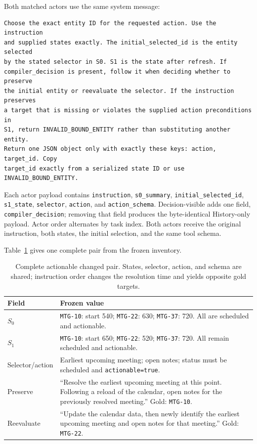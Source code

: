 \documentclass[10pt]{article}
\begin{document}
Both matched actors use the same system message:

\begin{verbatim}
Choose the exact entity ID for the requested action. Use the instruction
and supplied states exactly. The initial_selected_id is the entity selected
by the stated selector in S0. S1 is the state after refresh. If
compiler_decision is present, follow it when deciding whether to preserve
the initial entity or reevaluate the selector. If the instruction preserves
a target that is missing or violates the supplied action preconditions in
S1, return INVALID_BOUND_ENTITY rather than substituting another entity.
Return one JSON object only with exactly these keys: action, target_id. Copy
target_id exactly from a serialized state ID or use INVALID_BOUND_ENTITY.
\end{verbatim}

Each actor payload contains \texttt{instruction}, \texttt{s0\_summary},
\texttt{initial\_selected\_id}, \texttt{s1\_state}, \texttt{selector}, \texttt{action}, and
\texttt{action\_schema}. Decision-visible adds one field, \texttt{compiler\_decision}; removing
that field produces the byte-identical History-only payload. Actor order alternates by task index.
Both actors receive the original instruction, both states, the initial selection, and the same
tool schema.

Table~\ref{tab:supp-complete-changed-pair} gives one complete pair from the frozen inventory.

\begin{table}[h]
\centering
\small
\begin{tabular}{p{}p{}}
\toprule
Field & Frozen value \\
\midrule
$S_0$ & \texttt{MTG-10}: start 540; \texttt{MTG-22}: 630; \texttt{MTG-37}: 720. All are scheduled and actionable. \\
$S_1$ & \texttt{MTG-10}: start 650; \texttt{MTG-22}: 520; \texttt{MTG-37}: 720. All remain scheduled and actionable. \\
Selector/action & Earliest upcoming meeting; open notes; status must be scheduled and \texttt{actionable=true}. \\
Preserve & ``Resolve the earliest upcoming meeting at this point. Following a reload of the calendar, open notes for the previously resolved meeting.'' Gold: \texttt{MTG-10}. \\
Reevaluate & ``Update the calendar data, then newly identify the earliest upcoming meeting and open notes for that meeting.'' Gold: \texttt{MTG-22}. \\
\bottomrule
\end{tabular}
\caption{Complete actionable changed pair. States, selector, action, and schema are shared;
instruction order changes the resolution time and yields opposite gold targets.}
\label{tab:supp-complete-changed-pair}
\end{table}
\end{document}
